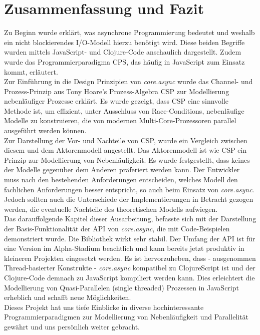 \chapter{Zusammenfassung und Fazit}

Zu Beginn wurde erklärt, was asynchrone Programmierung bedeutet und weshalb ein nicht blockierendes \acs{I/O}-Modell hierzu benötigt wird. Diese beiden Begriffe wurden mittels JavaScript- und Clojure-Code anschaulich dargestellt. Zudem wurde das Programmierparadigma \acf{CPS}, das häufig in JavaScript zum Einsatz kommt, erläutert.\\
Zur Einführung in die Design Prinzipien von \textit{core.async} wurde das Channel- und Prozess-Prinzip aus Tony Hoare's Prozess-Algebra \acf{CSP} zur Modellierung nebenläufiger Prozesse erklärt. Es wurde gezeigt, dass \acs{CSP} eine sinnvolle Methode ist, um effizient, unter Ausschluss von  Race-Conditions, nebenläufige Modelle zu konstruieren, die von modernen Multi-Core-Prozessoren parallel ausgeführt werden können.\\
Zur Darstellung der Vor- und Nachteile von \acs{CSP}, wurde ein Vergleich zwischen diesem und dem Aktorenmodell angestellt. Das Aktorenmodell ist wie \acs{CSP} ein Prinzip zur Modellierung von Nebenläufigkeit. Es wurde festgestellt, dass keines der Modelle gegenüber dem Anderen präferiert werden kann. Der Entwickler muss nach den bestehenden Anforderungen entscheiden, welches Modell den fachlichen Anforderungen besser entspricht, so auch beim Einsatz von \textit{core.async}. Jedoch sollten auch die Unterschiede der Implementierungen in Betracht gezogen werden, die eventuelle Nachteile des theoretischen Modells aufwiegen.\\
Das darauffolgende Kapitel dieser Ausarbeitung, befasste sich mit der Darstellung der Basis-Funktionalität der \acs{API} von \textit{core.async}, die mit Code-Beispielen demonstriert wurde. Die Bibliothek wirkt sehr stabil. Der Umfang der \acs{API} ist für eine Version im Alpha-Stadium beachtlich und kann bereits jetzt produktiv in kleineren Projekten eingesetzt werden. Es ist hervorzuheben, dass - ausgenommen Thread-basierter Konstrukte - \textit{core.async} kompatibel zu ClojureScript ist und der Clojure-Code demnach zu JavaScript kompiliert werden kann. Dies erleichtert die Modellierung von Quasi-Parallelen (single threaded) Prozessen in JavaScript erheblich und schafft neue Möglichkeiten.\\
Dieses Projekt hat uns tiefe Einblicke in diverse hochinteressante Programmierparadigmen zur Modellierung von Nebenläufigkeit und Parallelität gewährt und uns persönlich weiter gebracht.



